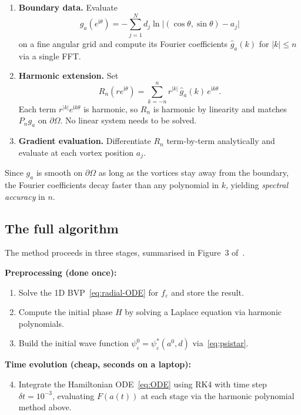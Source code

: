 \documentclass[12pt, a4paper]{article}
\theoremstyle{plain}
\theoremstyle{definition}
\newcommand{\psieps}{\psi_\varepsilon}
\newcommand{\psistar}{\psi^*_\varepsilon}
\newcommand{\abs}[1]{\left\lvert #1 \right\rvert}
\begin{document}
\begin{enumerate}
  \item \textbf{Boundary data.}
        Evaluate
        \[
          g_a(e^{\mathrm{i}\theta})
          = -\sum_{j=1}^N d_j\ln\bigl\lvert(\cos\theta,\sin\theta) - a_j\bigr\rvert
        \]
        on a fine angular grid and compute its Fourier coefficients
        $\hat g_a(k)$ for $\abs{k} \le n$ via a single FFT.
  \item \textbf{Harmonic extension.}
        Set
        \[
          R_n(re^{\mathrm{i}\theta})
          = \sum_{k=-n}^{n} r^{\abs{k}}\,\hat g_a(k)\,e^{\mathrm{i}k\theta}.
        \]
        Each term $r^{|k|}e^{\mathrm{i}k\theta}$ is harmonic,
        so $R_n$ is harmonic by linearity and matches $P_n g_a$ on $\partial\Omega$.
        No linear system needs to be solved.
  \item \textbf{Gradient evaluation.}
        Differentiate $R_n$ term-by-term analytically
        and evaluate at each vortex position $a_j$.
\end{enumerate}

Since $g_a$ is smooth on $\partial\Omega$ as long as the vortices stay
away from the boundary, the Fourier coefficients decay faster than
any polynomial in $k$, yielding \emph{spectral accuracy} in $n$.

\subsection{The full algorithm}

The method proceeds in three stages, summarised in Figure~3 of~\cite{CorsoKemlinMelcherStamm2024}.

\medskip
\textbf{Preprocessing (done once):}
\begin{enumerate}
  \item Solve the 1D BVP~\eqref{eq:radial-ODE} for $f_\varepsilon$
        and store the result.
  \item Compute the initial phase $H$ by solving a Laplace equation
        via harmonic polynomials.
  \item Build the initial wave function
        $\psieps^0 = \psistar(a^0, d)$ via~\eqref{eq:psistar}.
\end{enumerate}

\textbf{Time evolution (cheap, seconds on a laptop):}
\begin{enumerate}
  \setcounter{enumi}{3}
  \item Integrate the Hamiltonian ODE~\eqref{eq:ODE} using RK4
        with time step $\delta t = 10^{-3}$, evaluating $F(a(t))$
        at each stage via the harmonic polynomial method above.
\end{enumerate}
\end{document}
